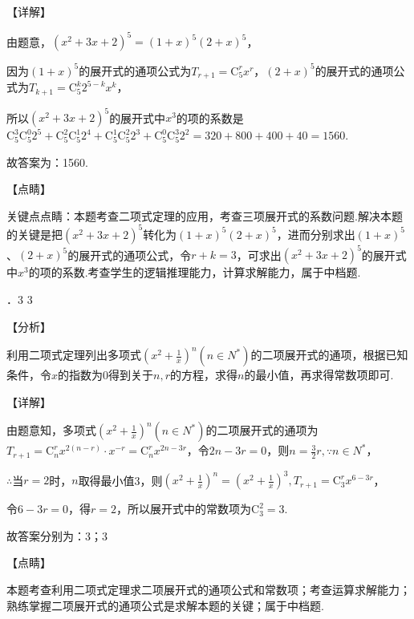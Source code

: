\noindent 【详解】

\noindent 由题意，$(x^{2} +3x+2)^{5} =\left(1+x\right)^{5} \left(2+x\right)^{5} $，

\noindent 因为$\left(1+x\right)^{5} $的展开式的通项公式为$T_{r+1} =\mathrm C_{5}^{r} x^{r} $，$\left(2+x\right)^{5} $的展开式的通项公式为$T_{k+1} =\mathrm C_{5}^{k} 2^{5-k} x^{k} $，

\noindent 所以$(x^{2} +3x+2)^{5} $的展开式中$x^{3} $的项的系数是$\mathrm C_{5}^{3} \mathrm C_{5}^{0} 2^{5} +\mathrm C_{5}^{2} \mathrm C_{5}^{1} 2^{4} +\mathrm C_{5}^{1} \mathrm C_{5}^{2} 2^{3} +\mathrm C_{5}^{0} \mathrm C_{5}^{3} 2^{2} $$=320+800+400+40=1560$.

\noindent 故答案为：1560.

\noindent 【点睛】

\noindent 关键点点睛：本题考查二项式定理的应用，考查三项展开式的系数问题.解决本题的关键是把$(x^{2} +3x+2)^{5} $转化为$\left(1+x\right)^{5} \left(2+x\right)^{5} $，进而分别求出$\left(1+x\right)^{5} $、$\left(2+x\right)^{5} $的展开式的通项公式，令$r+k=3$，可求出$(x^{2} +3x+2)^{5} $的展开式中$x^{3} $的项的系数.考查学生的逻辑推理能力，计算求解能力，属于中档题.

．3    3    

\noindent 【分析】

\noindent 利用二项式定理列出多项式$\left(x^{2} +\frac{1}{x} \right)^{n} \left(n\in N^{*} \right)$的二项展开式的通项，根据已知条件，令$x$的指数为$0$得到关于$n,r$的方程，求得$n$的最小值，再求得常数项即可.

\noindent 【详解】

\noindent 由题意知，多项式$\left(x^{2} +\frac{1}{x} \right)^{n} \left(n\in N^{*} \right)$的二项展开式的通项为$T_{r+1} =\mathrm C_{n}^{r} x^{2(n-r)} \cdot x^{-r} =\mathrm C_{n}^{r} x^{2n-3r} $，令$2n-3r=0$，则$n=\frac{3}{2} r,\because n\in N^{*} $，

\noindent $\therefore $当$r=2$时，$n$取得最小值3，则$\left(x^{2} +\frac{1}{x} \right)^{n} =\left(x^{2} +\frac{1}{x} \right)^{3} ,T_{r+1} =\mathrm C_{3}^{r} x^{6-3r} $，

\noindent 令$6-3r=0$，得$r=2$，所以展开式中的常数项为$\mathrm C_{3}^{2} =3$.

\noindent 故答案分别为：$3$；$3$

\noindent 【点睛】

\noindent 本题考查利用二项式定理求二项展开式的通项公式和常数项；考查运算求解能力；熟练掌握二项展开式的通项公式是求解本题的关键；属于中档题.

